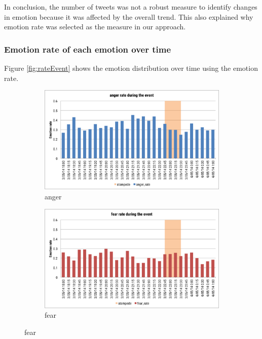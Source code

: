 In conclusion, the number of tweets was not a robust measure to identify changes in emotion because it was affected by the overall trend. This also explained why emotion rate was selected as the measure in our approach.

\subsubsection{Emotion rate of each emotion over time}
Figure \ref{fig:rateEvent} shows the emotion distribution over time using the emotion rate. 

\begin{figure}[hb!] 
\centering    
\begin{subfigure}{0.5\textwidth}
\centering
\includegraphics[width=0.99\linewidth]{AngerRateEvent}
\caption{anger}
\label{fig:angerRateEvent}
\end{subfigure}%
\begin{subfigure}{0.5\textwidth}
\centering    
\includegraphics[width=0.99\linewidth]{FearRateEvent}
\caption{fear}
\label{fig:fearRateEvent}
\end{subfigure}


\end{figure}
